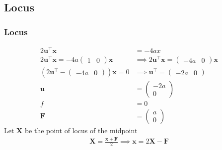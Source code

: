 \documentclass{beamer}
\providecommand{\brak}[1]{\ensuremath{\left(#1\right)}}
\theoremstyle{remark}
\newcommand{\myvec}[1]{\ensuremath{\begin{pmatrix}#1\end{pmatrix}}}
\let\vec\mathbf
\numberwithin{equation}{section}
\begin{document}
\subsection{Locus}
\begin{frame}
\frametitle{Locus}
 \begin{align}
     2\vec{u}^\top\vec{x}&=-4ax\\
     2\vec{u}^\top\vec{x}=-4a\myvec{1 & 0}\vec{x} &\implies  2\vec{u}^\top\vec{x}=\myvec{-4a & 0}\vec{x}\\
     \brak{2\vec{u}^\top-\myvec{-4a & 0}}\vec{x}=0 &\implies \vec{u}^\top=\myvec{-2a & 0}\\
     \vec{u}&=\myvec{-2a\\0}\\
     f&=0\\
     \vec{F}&=\myvec{a\\0}
     \end{align}
     Let $\vec{X}$ be the point of locus of the midpoint
\begin{align}
    \vec{X}=\frac{\vec{x}+\vec{F}}{2}\implies
    \vec{x}=2\vec{X}-\vec{F}
\end{align}     

\end{frame}
\end{document}
